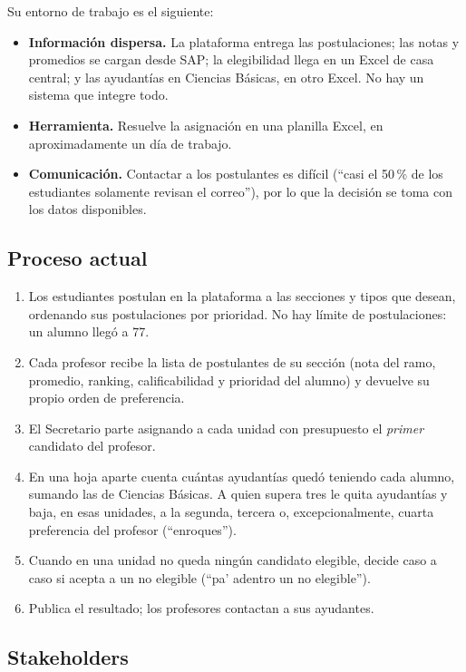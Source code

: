 \documentclass{article}
\begin{document}
Su entorno de trabajo es el siguiente:
\begin{itemize}
    \item \textbf{Información dispersa.} La plataforma entrega las postulaciones; las notas y promedios se cargan desde SAP; la elegibilidad llega en un Excel de casa central; y las ayudantías en Ciencias Básicas, en otro Excel. No hay un sistema que integre todo.
    \item \textbf{Herramienta.} Resuelve la asignación en una planilla Excel, en aproximadamente un día de trabajo.
    \item \textbf{Comunicación.} Contactar a los postulantes es difícil (``casi el 50\,\% de los estudiantes solamente revisan el correo''), por lo que la decisión se toma con los datos disponibles.
\end{itemize}

\subsection{Proceso actual}
\label{sec:proceso}

\begin{enumerate}
    \item Los estudiantes postulan en la plataforma a las secciones y tipos que desean, ordenando sus postulaciones por prioridad. No hay límite de postulaciones: un alumno llegó a 77.
    \item Cada profesor recibe la lista de postulantes de su sección (nota del ramo, promedio, ranking, calificabilidad y prioridad del alumno) y devuelve su propio orden de preferencia.
    \item El Secretario parte asignando a cada unidad con presupuesto el \emph{primer} candidato del profesor.
    \item En una hoja aparte cuenta cuántas ayudantías quedó teniendo cada alumno, sumando las de Ciencias Básicas. A quien supera tres le quita ayudantías y baja, en esas unidades, a la segunda, tercera o, excepcionalmente, cuarta preferencia del profesor (``enroques'').
    \item Cuando en una unidad no queda ningún candidato elegible, decide caso a caso si acepta a un no elegible (``pa' adentro un no elegible'').
    \item Publica el resultado; los profesores contactan a sus ayudantes.
\end{enumerate}

\subsection{Stakeholders}
\end{document}
